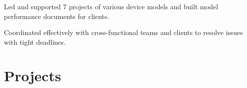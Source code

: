 \documentclass[letterpaper]{deedy-resume-openfont}
\begin{document}
\begin{tightemize}
\item Led and supported 7 projects of various device models and built model performance documents for clients.
\item Coordinated effectively with cross-functional teams and clients to resolve issues with tight deadlines.

\end{tightemize}
\sectionsep


\section{Projects}

\end{document}
